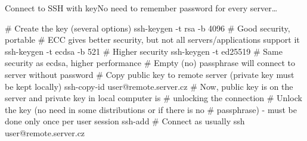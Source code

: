 \documentclass[compress, xelatex, 11pt, xcolor=svgnames, aspectratio=169,
	hyperref={
		bookmarks=true,
		unicode=true,
		colorlinks=true,
		pdftitle={Linux, command line and MetaCentrum},
		plainpages=false,
		pdfauthor={Vojtech Zeisek},
		pdfsubject={Course about use of Linux command line, writing shell scripts and using MetaCentrum of CESNET},
		pdfcreator={XeLaTeX},
		pdfkeywords={Linux, GNU, BASH, shell, command line, MetaCentrum},
		linkcolor=DarkRed, %
		anchorcolor=DarkBlue, %
		citecolor=Indigo, %
		filecolor=NavyBlue, %
		menucolor=DarkMagenta, %
		urlcolor=DarkBlue, %
		},
	url={hyphens, lowtilde} %
	]{beamer}
\begin{document}
\begin{frame}[fragile]{Connect to SSH with key}{No need to remember password for every server\ldots}
	\begin{bashcode}
    # Create the key (several options)
    ssh-keygen -t rsa -b 4096 # Good security, portable
    # ECC gives better security, but not all servers/applications support it
    ssh-keygen -t ecdsa -b 521 # Higher security
    ssh-keygen -t ed25519 # Same security as ecdsa, higher performance
    # Empty (no) passphrase will connect to server without password
    # Copy public key to remote server (private key must be kept locally)
    ssh-copy-id user@remote.server.cz
    # Now, public key is on the server and private key in local computer is
    # unlocking the connection
    # Unlock the key (no need in some distributions or if there is no
    # passphrase) - must be done only once per user session
    ssh-add
    # Connect as usually
    ssh user@remote.server.cz
	\end{bashcode}
\end{frame}
\end{document}
